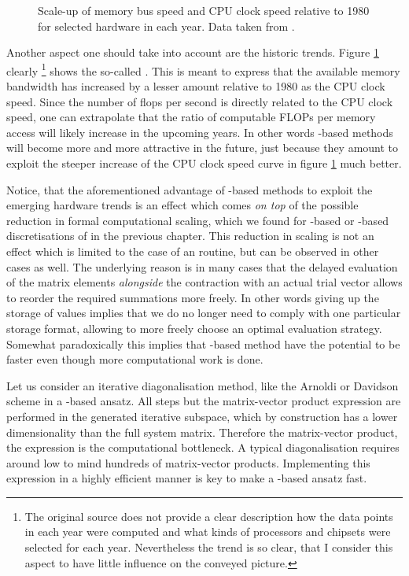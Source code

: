\begin{figure}
	\centering
	\caption[Scale-up of memory bus speed and CPU clock speed]
	{Scale-up of memory bus speed and CPU clock speed
		relative to 1980 for selected hardware in each year.
		Data taken from \cite{Gocon2014}.}
	\label{fig:MemCpuSpeedup}
\end{figure}
Another aspect one should take into account are the historic trends.
Figure \ref{fig:MemCpuSpeedup} clearly%
\footnote{The original source \cite{Gocon2014}
does not provide a clear description how the data points in each year
were computed and what kinds of processors and chipsets
were selected for each year.
Nevertheless the trend is so clear, that I consider this aspect
to have little influence on the conveyed picture.}
shows the so-called .
This is meant to express that the available memory bandwidth
has increased by a lesser amount relative to 1980 as the CPU clock speed.
Since the number of flops per second is directly related to the CPU clock speed,
one can extrapolate that the ratio of computable FLOPs per memory access
will likely increase in the upcoming years.
In other words \contraction-based methods
will become more and more attractive in the future,
just because they amount to exploit the steeper increase of the CPU clock
speed curve in figure \ref{fig:MemCpuSpeedup} much better.

Notice, that the aforementioned advantage of \contraction-based methods
to exploit the emerging hardware trends
is an effect which comes \emph{on top}
of the possible reduction in formal computational scaling,
which we found for \FE-based or \CS-based discretisations of \HF in the previous chapter.
This reduction in scaling is not an effect
which is limited to the case of an \SCF routine,
but can be observed in other cases as well.
The underlying reason is in many cases
that the delayed evaluation of the matrix elements
\emph{alongside} the contraction with an actual trial vector
allows to reorder the required summations more freely.
In other words giving up the storage of values
implies that we do no longer need to comply with one particular storage format,
allowing to more freely choose an optimal evaluation strategy.
Somewhat paradoxically this implies that
\contraction-based method have the potential
to be faster even though more computational work is done.

Let us consider an iterative diagonalisation method,
like the Arnoldi or Davidson scheme
in a \contraction-based ansatz.
All steps but the matrix-vector product expression
are performed in the generated iterative subspace,
which by construction has a lower dimensionality
than the full system matrix.
Therefore the matrix-vector product,
\ie the \contraction expression is the computational bottleneck.
A typical diagonalisation requires
around low to mind hundreds of matrix-vector products.
Implementing this \contraction expression
in a highly efficient manner is
key to make a \contraction-based ansatz fast.

